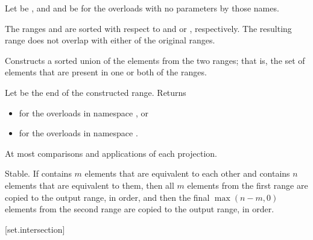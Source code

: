 \begin{itemdescr}
\pnum
Let  be ,
and  and  be 
for the overloads with no parameters by those names.

\pnum
\expects
The ranges  and  are sorted
with respect to  and  or , respectively.
The resulting range does not overlap with either of the original ranges.

\pnum
\effects
Constructs a sorted union of the elements from the two ranges;
that is, the set of elements that are present in one or both of the ranges.

\pnum
\returns
Let  be the end of the constructed range.
Returns
\begin{itemize}
\item
  for the overloads in namespace , or
\item
  for the overloads in namespace .
\end{itemize}

\pnum
\complexity
At most 
comparisons and applications of each projection.

\pnum
\remarks
Stable.
If  contains $m$ elements
that are equivalent to each other and
 contains $n$ elements
that are equivalent to them,
then all $m$ elements from the first range
are copied to the output range, in order, and
then the final $\max(n - m, 0)$ elements from the second range
are copied to the output range, in order.
\end{itemdescr}

[set.intersection]{}

